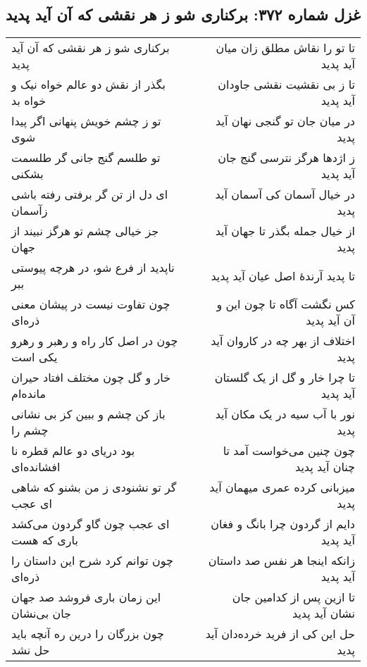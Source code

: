 \begin{center}
\section*{غزل شماره ۳۷۲: برکناری شو ز هر نقشی که آن آید پدید}
\label{sec:372}
\begin{longtable}{l p{0.5cm} r}
برکناری شو ز هر نقشی که آن آید پدید
&&
تا تو را نقاش مطلق زان میان آید پدید
\\
بگذر از نقش دو عالم خواه نیک و خواه بد
&&
تا ز بی نقشیت نقشی جاودان آید پدید
\\
تو ز چشم خویش پنهانی اگر پیدا شوی
&&
در میان جان تو گنجی نهان آید پدید
\\
تو طلسم گنج جانی گر طلسمت بشکنی
&&
ز اژدها هرگز نترسی گنج جان آید پدید
\\
ای دل از تن گر برفتی رفته باشی زآسمان
&&
در خیال آسمان کی آسمان آید پدید
\\
جز خیالی چشم تو هرگز نبیند از جهان
&&
از خیال جمله بگذر تا جهان آید پدید
\\
ناپدید از فرع شو، در هرچه پیوستی ببر
&&
تا پدید آرندهٔ اصل عیان آید پدید
\\
چون تفاوت نیست در پیشان معنی ذره‌ای
&&
کس نگشت آگاه تا چون این و آن آید پدید
\\
چون در اصل کار راه و رهبر و رهرو یکی است
&&
اختلاف از بهر چه در کاروان آید پدید
\\
خار و گل چون مختلف افتاد حیران مانده‌ام
&&
تا چرا خار و گل از یک گلستان آید پدید
\\
باز کن چشم و ببین کز بی نشانی چشم را
&&
نور با آب سیه در یک مکان آید پدید
\\
بود دریای دو عالم قطره نا افشانده‌ای
&&
چون چنین می‌خواست آمد تا چنان آید پدید
\\
گر تو نشنودی ز من بشنو که شاهی ای عجب
&&
میزبانی کرده عمری میهمان آید پدید
\\
ای عجب چون گاو گردون می‌کشد باری که هست
&&
دایم از گردون چرا بانگ و فغان آید پدید
\\
چون توانم کرد شرح این داستان را ذره‌ای
&&
زانکه اینجا هر نفس صد داستان آید پدید
\\
این زمان باری فروشد صد جهان جان بی‌نشان
&&
تا ازین پس از کدامین جان نشان آید پدید
\\
چون بزرگان را درین ره آنچه باید حل نشد
&&
حل این کی از فرید خرده‌دان آید پدید
\\
\end{longtable}
\end{center}
